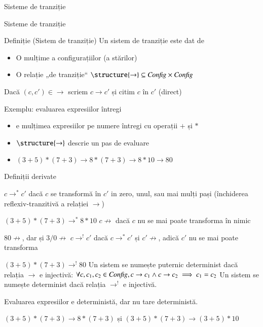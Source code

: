 \documentclass[xcolor=pdftex,romanian,colorlinks]{beamer}
\begin{document}
\begin{section}{Sisteme de tranziție}
\begin{frame}{Sisteme de tranziție}{}
\begin{block}{Definiție (Sistem de tranziție)}
Un sistem de tranziție este dat de 
\begin{itemize}
\item O mulțime  a configurațiilor (a stărilor)
\item O relație „de tranziție“ $\structure{\rightarrow} \subseteq {\it Config} \times {\it Config}$
\end{itemize}
Dacă $(c,c') \in {\rightarrow}$ scriem $c \rightarrow c'$ și citim 
%
$c$   în $c'$ (direct)
\end{block}

\begin{block}{Exemplu: evaluarea expresiilor întregi}
\begin{itemize}
\item {} e mulțimea expresiilor pe numere întregi cu operații $+$ și $*$
\item  $\structure{\rightarrow}$ descrie un pas de evaluare
\item<2> $(3+5)*(7+3) \rightarrow 8*(7+3)\rightarrow 8*10 \rightarrow 80$
\end{itemize}
\end{block}
\end{frame}

\begin{frame}{Definiții derivate}
\begin{description}
\vitem[$\rightarrow^\ast$] $c \rightarrow^\ast c'$ dacă $c$ se transformă în $c'$ in zero, unul, sau mai mulți pași (închiderea reflexiv-tranzitivă a relației $\rightarrow$)

$(3+5)*(7+3)  \rightarrow^\ast 8*10$
\vitem[$\not\rightarrow$] $c \not\rightarrow$ dacă $c$ nu se mai poate transforma în nimic

$80 \not\rightarrow$, dar și $3/0\not\rightarrow$
\vitem[$\rightarrow^!$] $c \rightarrow^! c'$ dacă $c\rightarrow^\ast c'$ și $c'\not\rightarrow$, adică $c'$ nu se mai poate transforma 

$(3+5)*(7+3)  \rightarrow^! 80$
\vitem[Determinism] Un sistem se numește puternic  determinist dacă relația $\rightarrow$ e injectivă:
\(\forall c, c_1, c_2\in {\it Config},  c \rightarrow c_1 \wedge c \rightarrow c_2 \implies c_1 = c_2\)
Un sistem se numește determinist dacă relația $\rightarrow^!$ e injectivă.

Evaluarea expresiilor e deterministă, dar nu tare deterministă.

$(3+5)*(7+3) \rightarrow 8*(7+3)$ și $(3+5)*(7+3) \rightarrow (3+5)*10$
\end{description}
\end{frame}

\end{section}
\end{document}
